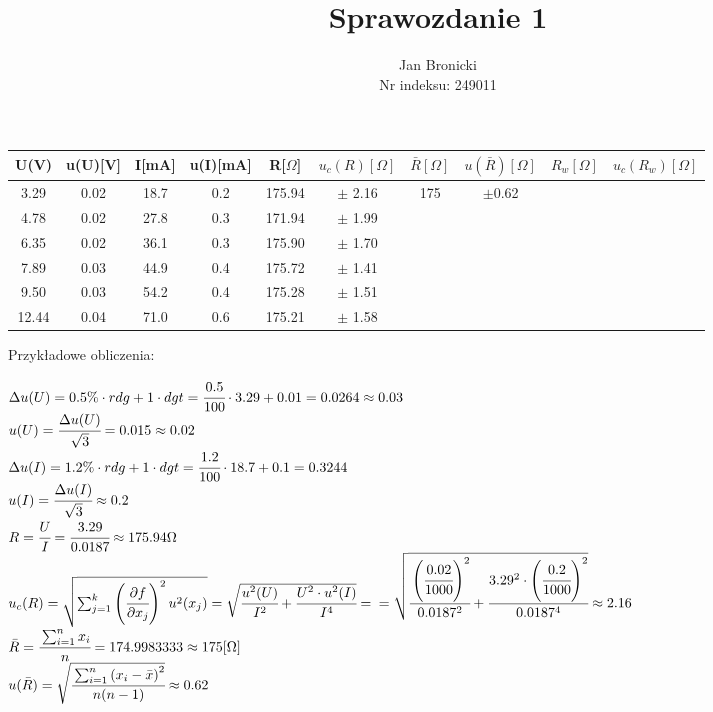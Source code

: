 \documentclass{article}
\title{Sprawozdanie 1}
\author{Jan Bronicki\\
Nr indeksu: 249011}
\date{}
\begin{document}
\maketitle



\begin{center}
    \renewcommand{\arraystretch}{1.3}
\begin{tabular}{ |c|c|c|c|c|c|c|c|c|c| }
    \hline
    U(V)&u(U)[V]&I[mA]&u(I)[mA]&R[$\Omega$]&$u_c(R)[\Omega]$&$\bar{R}[\Omega]$&$u(\bar{R})[\Omega]$&$R_w[\Omega]$&$u_c(R_w)[\Omega]$ \\
    \hline \hline
    3.29&0.02&18.7&0.2&175.94&$\pm$ 2.16& \multirow{6}{*}{175}&\multirow{6}{*}{$\pm$0.62}&&\\ 
    \cline{1-6}
    \cline{9-10}
    4.78&0.02&27.8&0.3&171.94&$\pm$ 1.99&&&&\\ 
    \cline{1-6}
    \cline{9-10}
    6.35&0.02&36.1&0.3&175.90&$\pm$ 1.70&&&&\\ 
    \cline{1-6}
    \cline{9-10}
    7.89&0.03&44.9&0.4&175.72&$\pm$ 1.41&&&&\\ 
    \cline{1-6}
    \cline{9-10}
    9.50&0.03&54.2&0.4&175.28&$\pm$ 1.51&&&&\\ 
    \cline{1-6}
    \cline{9-10}
    12.44&0.04&71.0&0.6&175.21&$\pm$ 1.58&&&&\\ 
    \hline
\end{tabular}
\end{center}
Przykładowe obliczenia:
\begin{center}
    $\Delta u(U)  = 0.5\% \cdot rdg+1 \cdot dgt=\cfrac{0.5}{100} \cdot 3.29 + 0.01=0.0264\approx0.03$\\
    $u(U)=\cfrac{\Delta u(U)}{\sqrt{3}}=0.015\approx0.02$\\
    $\Delta u(I) = 1.2\% \cdot rdg+1 \cdot dgt = \cfrac{1.2}{100} \cdot 18.7 +0.1 =0.3244$\\
    $u(I)= \cfrac{\Delta u(I)}{\sqrt{3}} \approx 0.2$\\
    $R=\cfrac{U}{I} = \cfrac{3.29}{0.0187} \approx 175.94 \Omega$\\
    $u_c (R)=\sqrt{\sum_{j=1}^{k}\left( \cfrac{\partial f}{\partial x_j}\right)^2 u^2 (x_j)}
    =\sqrt{\cfrac{u^2 (U)}{I^2} + \cfrac{U^2 \cdot u^2 (I)}{I^4}}=$
    $= \sqrt{\cfrac{\left(\cfrac{0.02}{1000}\right)^2}{0.0187^2} + \cfrac{3.29^2 \cdot \left(\cfrac{0.2}{1000}\right)^2}{0.0187^4}}\approx 2.16$\\
    $\bar{R} = \cfrac{\sum_{i=1}^{n}x_i}{n}=174.9983333 \approx 175[\Omega]$\\
    $u(\bar{R}) = \sqrt{\cfrac{\sum_{i=1}^{n} \left(x_i - \bar{x} \right)^2}{n(n-1)}}\approx 0.62$\\

\end{center}
\end{document}
